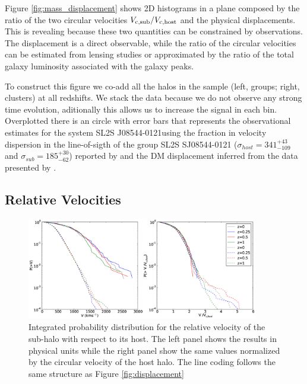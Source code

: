 \documentclass{emulateapj}
\newcommand{\kms}{{\ifmmode{{\mathrm{\,km\ s}^{-1}}}\else{\,km~s$^{-1}$}\fi}}
\newcommand{\bullg}{SL2S J08544-0121}
\begin{document}
Figure \ref{fig:mass_displacement} shows 2D histograms in a plane
composed by the ratio of the two circular velocities $V_{\rm c,
  sub}/V_{\rm c, host}$ and the physical displacements. This is
revealing because these two quantities can be constrained by
observations. The displacement is a direct observable, while the ratio
of the circular velocities can be estimated from lensing studies or
approximated by the ratio of the total galaxy luminosity associated
with the galaxy peaks.

To construct this figure we co-add all the halos in the sample (left,
groups; right, clusters) at all redshifts. We stack the data because
we do not observe any strong time evolution, aditionally this allows
us to increase the signal in each bin. Overplotted there is an circle
with error bars that represents the observational estimates for the
system \bullg using the fraction in velocity dispersion in
the line-of-sigth of the group SL2S SJ08544-0121
($\sigma_{host}=341^{+43}_{-109}$\kms and
$\sigma_{sub}=185^{+30}_{-62}$\kms) reported by
\citet{2013A&A...552A..80M} and the DM displacement inferred from the
data presented by \cite{Gastaldello}.


\subsection{Relative Velocities}
\label{sec:velocities}

\begin{figure}
\begin{center}
\includegraphics[width=0.9\textwidth]{Figures_eps/figure_3.eps}
\end{center}
\caption{Integrated probability distribution for the relative velocity of the
sub-halo with respect to its host. The left panel shows the results
in physical units while the right panel show the same values
normalized by the circular velocity of the host halo. The line coding
follows the same structure as Figure \ref{fig:displacement}}
\label{fig:velocities}
\end{figure}
\end{document}
